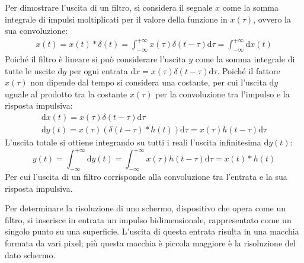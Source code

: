 \documentclass{article}
\newcommand{\df}{\mathrm{d}}
\numberwithin{equation}{subsection}
\begin{document}
Per dimostrare l'uscita di un filtro, si considera il segnale $x$ come la somma integrale di impulsi moltiplicati per il valore della funzione in $x(\tau)$, ovvero la sua 
convoluzione:
\begin{gather*}
    x(t)=x(t)*\delta(t)=\displaystyle\int_{-\infty}^{+\infty}x(\tau)\delta(t-\tau)\df\tau=\int_{-\infty}^{+\infty}\df x(t)
\end{gather*}
Poiché il filtro è lineare si può considerare l'uscita $y$ come la somma integrale di tutte le uscite $\df y$ per ogni entrata $\df x=x(\tau)\delta(t-\tau)\df\tau$. Poiché il fattore 
$x(\tau)$ non dipende dal tempo si considera una costante, per cui l'uscita $\df y$ uguale al prodotto tra la costante $x(\tau)$ per la convoluzione tra l'impulso e la 
risposta impulsiva:
\begin{gather*}
    \df x(t)=x(\tau)\delta(t-\tau)\df\tau\\
    \df y(t)=x(\tau)(\delta(t-\tau)*h(t))\df\tau=x(\tau)h(t-\tau)\df\tau
\end{gather*}
L'uscita totale si ottiene integrando su tutti i reali l'uscita infinitesima $\df y(t)$:
\begin{equation*}
    y(t)=\displaystyle\int_{-\infty}^{+\infty}\df y(t)=\int_{-\infty}^{+\infty}x(\tau)h(t-\tau)\df\tau=x(t)*h(t)
\end{equation*}
Per cui l'uscita di un filtro corrisponde alla convoluzione tra l'entrata e la sua risposta impulsiva. 

Per determinare la risoluzione di uno schermo, dispositivo che opera come un filtro, si inserisce in entrata un impulso bidimensionale, rappresentato come un singolo punto 
su una superficie. L'uscita di questa entrata risulta in una macchia formata da vari pixel; più questa macchia è piccola maggiore è la risoluzione del dato schermo.  
\end{document}
